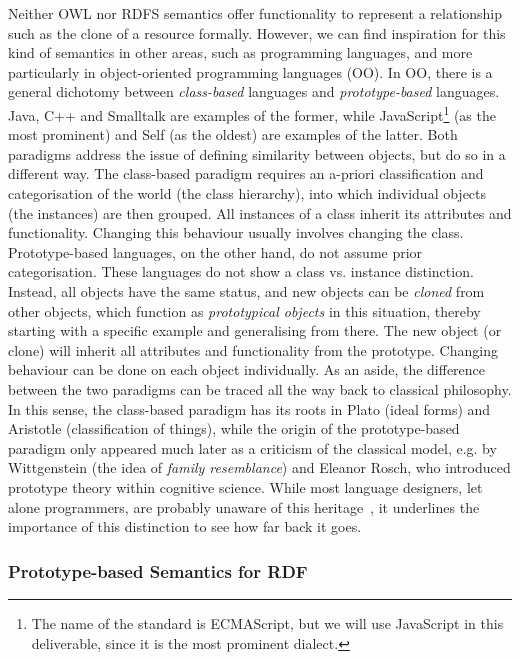 \documentclass{article}
\begin{document}
Neither OWL nor RDFS semantics offer functionality to represent a relationship such as the clone of a resource formally. However, we can find inspiration for this kind of semantics in other areas, such as programming languages, and more particularly in object-oriented programming languages (OO). In OO, there is a general dichotomy between \emph{class-based} languages and \emph{prototype-based} languages. Java, C++ and Smalltalk are examples of the former, while JavaScript\footnote{The name of the standard is ECMAScript, but we will use JavaScript in this deliverable, since it is the most prominent dialect.} (as the most prominent) and Self (as the oldest) are examples of the latter. Both paradigms address the issue of defining similarity between objects, but do so in a different way. The class-based paradigm requires an a-priori classification and categorisation of the world (the class hierarchy), into which individual objects (the instances) are then grouped. All instances of a class inherit its attributes and functionality. Changing this behaviour usually involves changing the class. Prototype-based languages, on the other hand, do not assume prior categorisation. These languages do not show a class vs. instance distinction. Instead, all objects have the same status, and new objects can be \emph{cloned} from other objects, which function as \emph{prototypical objects} in this situation, thereby starting with a specific example and generalising from there. The new object (or clone) will inherit all attributes and functionality from the prototype. Changing behaviour can be done on each object individually. As an aside, the difference between the two paradigms can be traced all the way back to classical philosophy. In this sense, the class-based paradigm has its roots in Plato (ideal forms) and Aristotle (classification of things), while the origin of the prototype-based paradigm only appeared much later as a criticism of the classical model, e.g. by Wittgenstein (the idea of \emph{family resemblance}) and Eleanor Rosch, who introduced prototype theory within cognitive science. While most language designers, let alone programmers, are probably unaware of this heritage~\cite{Taivalsaari96classes_vs_prototypes}, it underlines the importance of this distinction to see how far back it goes.



\subsubsection{Prototype-based Semantics for RDF} %
\label{ssub:prototype_based_semantics_for_rdf}
\end{document}
